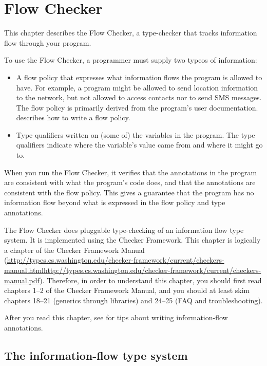 \htmlhr
\chapter{Flow Checker\label{flow-checker}}

This chapter describes the Flow Checker, a type-checker that 
tracks information flow through your program.

To use the Flow Checker, a programmer must supply two typeos of
information:
\begin{itemize}
\item
A flow policy that expresses what information flows the program is allowed
to have.  For example, a program might be allowed to send location
information to the network, but not allowed to access contacts nor to send
SMS messages.  The flow policy is primarily derived from the program's user
documentation.   describes how to write a flow
policy.
\item
Type qualifiers written on (some of) the variables in the program.  The
type qualifiers indicate where the variable's value came from and where it
might go to.
\end{itemize}

When you run the Flow Checker, it verifies that the annotations in the
program are consistent with what the program's code does, and that the
annotations are consistent with the flow policy.  This gives a guarantee
that the program has no information flow beyond what is expressed in the
flow policy and type annotations.

The Flow Checker does pluggable type-checking of an information flow type
system.  It is implemented using the Checker Framework.  This chapter is
logically a chapter of the 
Checker Framework Manual (\ifhevea\url{http://types.cs.washington.edu/checker-framework/current/checkers-manual.html}\else\url{http://types.cs.washington.edu/checker-framework/current/checkers-manual.pdf}\fi).
Therefore, in order to understand this chapter, you should first read
chapters 1--2 of the Checker Framework Manual, and you should at least skim
chapters 18--21 (generics through libraries) and 24--25 (FAQ and
troubleshooting).

After you read this chapter, see  for tips about
writing information-flow annotations.


\section{The information-flow type system\label{sec:flow-type-system}}

